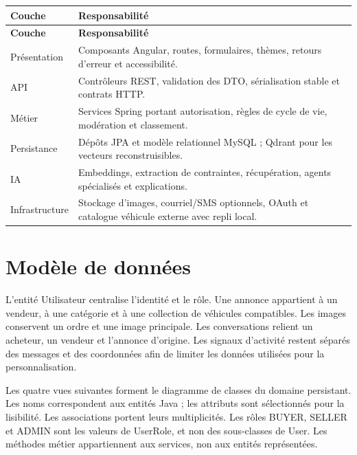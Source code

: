 {\small\singlespacing{}
\begin{longtable}{|>{\raggedright\arraybackslash}p{}|>{\raggedright\arraybackslash}p{}|}
\hline
\rowcolor{tablehead} \color{white}\bfseries Couche & \color{white}\bfseries Responsabilité \\ \hline
\endfirsthead
\rowcolor{tablehead} \color{white}\bfseries Couche & \color{white}\bfseries Responsabilité \\ \hline
\endhead
\hline\endfoot
Présentation & Composants Angular, routes, formulaires, thèmes, retours d'erreur et accessibilité. \\ \hline
\rowcolor{tablerow} API & Contrôleurs REST, validation des DTO, sérialisation stable et contrats HTTP. \\ \hline
Métier & Services Spring portant autorisation, règles de cycle de vie, modération et classement. \\ \hline
\rowcolor{tablerow} Persistance & Dépôts JPA et modèle relationnel MySQL ; Qdrant pour les vecteurs reconstruisibles. \\ \hline
IA & Embeddings, extraction de contraintes, récupération, agents spécialisés et explications. \\ \hline
\rowcolor{tablerow} Infrastructure & Stockage d'images, courriel/SMS optionnels, OAuth et catalogue véhicule externe avec repli local. \\ \hline
\end{longtable}
}


\section{Modèle de données}

L'entité Utilisateur centralise l'identité et le rôle. Une annonce appartient à un vendeur, à une catégorie et à une collection de véhicules compatibles. Les images conservent un ordre et une image principale. Les conversations relient un acheteur, un vendeur et l'annonce d'origine. Les signaux d'activité restent séparés des messages et des coordonnées afin de limiter les données utilisées pour la personnalisation.


Les quatre vues suivantes forment le diagramme de classes du domaine persistant. Les noms correspondent aux entités Java ; les attributs sont sélectionnés pour la lisibilité. Les associations portent leurs multiplicités. Les rôles BUYER, SELLER et ADMIN sont les valeurs de UserRole, et non des sous-classes de User. Les méthodes métier appartiennent aux services, non aux entités représentées.



